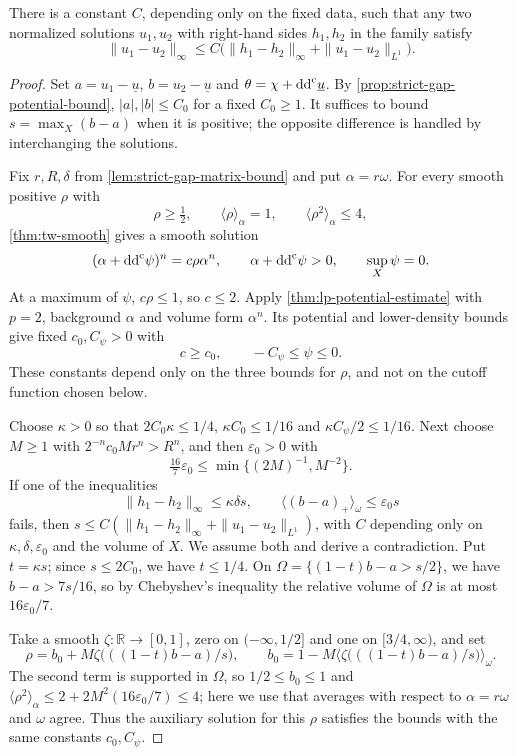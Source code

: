 \begin{theorem}\label{thm:concave-linear-stability}
There is a constant $C$, depending only on the fixed data, such that any two normalized solutions $u_1,u_2$ with right-hand sides $h_1,h_2$ in the family satisfy
\[
 \|u_1-u_2\|_\infty\leq C\bigl(\|h_1-h_2\|_\infty+\|u_1-u_2\|_{L^1}\bigr).
\]
\end{theorem}
\begin{proof}
Set $a=u_1-\underline u$, $b=u_2-\underline u$ and $\theta=\chi+\mathrm{dd}^{\mathrm{c}}\underline u$. By \cref{prop:strict-gap-potential-bound}, $|a|,|b|\leq C_0$ for a fixed $C_0\geq1$. It suffices to bound $s=\max_X(b-a)$ when it is positive; the opposite difference is handled by interchanging the solutions.

Fix $r,R,\delta$ from \cref{lem:strict-gap-matrix-bound} and put $\alpha=r\omega$. For every smooth positive $\rho$ with
\[
 \rho\geq\tfrac12,\qquad
 \langle\rho\rangle_\alpha=1,\qquad
 \langle\rho^2\rangle_\alpha\leq4,
\]
\cref{thm:tw-smooth} gives a smooth solution
\[
 (\alpha+\mathrm{dd}^{\mathrm{c}}\psi)^n=c\rho\alpha^n,\qquad
 \alpha+\mathrm{dd}^{\mathrm{c}}\psi>0,\qquad\sup_X\psi=0.
\]
At a maximum of $\psi$, $c\rho\leq1$, so $c\leq2$. Apply \cref{thm:lp-potential-estimate} with $p=2$, background $\alpha$ and volume form $\alpha^n$. Its potential and lower-density bounds give fixed $c_0,C_\psi>0$ with
\[
 c\geq c_0,\qquad -C_\psi\leq\psi\leq0.
\]
These constants depend only on the three bounds for $\rho$, and not on the cutoff function chosen below.

Choose $\kappa>0$ so that $2C_0\kappa\leq1/4$, $\kappa C_0\leq1/16$ and $\kappa C_\psi/2\leq1/16$. Next choose $M\geq1$ with $2^{-n}c_0Mr^n>R^n$, and then $\varepsilon_0>0$ with
\[
 \tfrac{16}{7}\varepsilon_0\leq\min\{(2M)^{-1},M^{-2}\}.
\]
If one of the inequalities
\[
 \|h_1-h_2\|_\infty\leq\kappa\delta s,
 \qquad\langle(b-a)_+\rangle_\omega\leq\varepsilon_0s
\]
fails, then $s\leq C(\|h_1-h_2\|_\infty+\|u_1-u_2\|_{L^1})$, with $C$ depending only on $\kappa,\delta,\varepsilon_0$ and the volume of $X$. We assume both and derive a contradiction. Put $t=\kappa s$; since $s\leq2C_0$, we have $t\leq1/4$. On $\Omega=\{(1-t)b-a>s/2\}$, we have $b-a>7s/16$, so by Chebyshev's inequality the relative volume of $\Omega$ is at most $16\varepsilon_0/7$.

Take a smooth $\zeta\colon\mathbb R\to[0,1]$, zero on $(-\infty,1/2]$ and one on $[3/4,\infty)$, and set
\[
 \rho=b_0+M\zeta\bigl(((1-t)b-a)/s\bigr),\qquad
 b_0=1-M\bigl\langle\zeta\bigl(((1-t)b-a)/s\bigr)\bigr\rangle_\omega.
\]
The second term is supported in $\Omega$, so $1/2\leq b_0\leq1$ and $\langle\rho^2\rangle_\alpha\leq2+2M^2(16\varepsilon_0/7)\leq4$; here we use that averages with respect to $\alpha=r\omega$ and $\omega$ agree. Thus the auxiliary solution for this $\rho$ satisfies the bounds with the same constants $c_0,C_\psi$.


\end{proof}

